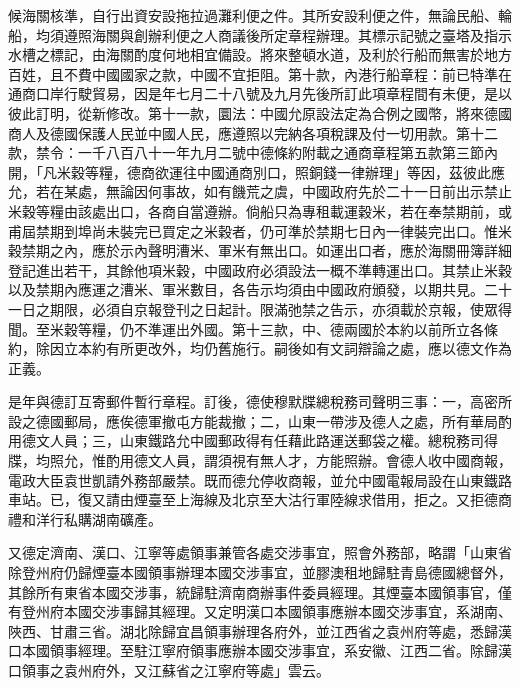\begin{pinyinscope}
候海關核準，自行出資安設拖拉過灘利便之件。其所安設利便之件，無論民船、輪船，均須遵照海關與創辦利便之人商議後所定章程辦理。其標示記號之臺塔及指示水槽之標記，由海關酌度何地相宜備設。將來整頓水道，及利於行船而無害於地方百姓，且不費中國國家之款，中國不宜拒阻。第十款，內港行船章程：前已特準在通商口岸行駛貿易，因是年七月二十八號及九月先後所訂此項章程間有未便，是以彼此訂明，從新修改。第十一款，圜法：中國允原設法定為合例之國幣，將來德國商人及德國保護人民並中國人民，應遵照以完納各項稅課及付一切用款。第十二款，禁令：一千八百八十一年九月二號中德條約附載之通商章程第五款第三節內開，「凡米穀等糧，德商欲運往中國通商別口，照銅錢一律辦理」等因，茲彼此應允，若在某處，無論因何事故，如有饑荒之虞，中國政府先於二十一日前出示禁止米穀等糧由該處出口，各商自當遵辦。倘船只為專租載運穀米，若在奉禁期前，或甫屆禁期到埠尚未裝完已買定之米穀者，仍可準於禁期七日內一律裝完出口。惟米穀禁期之內，應於示內聲明漕米、軍米有無出口。如運出口者，應於海關冊簿詳細登記進出若干，其餘他項米穀，中國政府必須設法一概不準轉運出口。其禁止米穀以及禁期內應運之漕米、軍米數目，各告示均須由中國政府頒發，以期共見。二十一日之期限，必須自京報登刊之日起計。限滿弛禁之告示，亦須載於京報，使眾得聞。至米穀等糧，仍不準運出外國。第十三款，中、德兩國於本約以前所立各條約，除因立本約有所更改外，均仍舊施行。嗣後如有文詞辯論之處，應以德文作為正義。

是年與德訂互寄郵件暫行章程。訂後，德使穆默牒總稅務司聲明三事：一，高密所設之德國郵局，應俟德軍撤屯方能裁撤；二，山東一帶涉及德人之處，所有華局酌用德文人員；三，山東鐵路允中國郵政得有任藉此路運送郵袋之權。總稅務司得牒，均照允，惟酌用德文人員，謂須視有無人才，方能照辦。會德人收中國商報，電政大臣袁世凱請外務部嚴禁。既而德允停收商報，並允中國電報局設在山東鐵路車站。已，復又請由煙臺至上海線及北京至大沽行軍陸線求借用，拒之。又拒德商禮和洋行私購湖南礦產。

又德定濟南、漢口、江寧等處領事兼管各處交涉事宜，照會外務部，略謂「山東省除登州府仍歸煙臺本國領事辦理本國交涉事宜，並膠澳租地歸駐青島德國總督外，其餘所有東省本國交涉事，統歸駐濟南商辦事件委員經理。其煙臺本國領事官，僅有登州府本國交涉事歸其經理。又定明漢口本國領事應辦本國交涉事宜，系湖南、陜西、甘肅三省。湖北除歸宜昌領事辦理各府外，並江西省之袁州府等處，悉歸漢口本國領事經理。至駐江寧府領事應辦本國交涉事宜，系安徽、江西二省。除歸漢口領事之袁州府外，又江蘇省之江寧府等處」雲云。


\end{pinyinscope}
